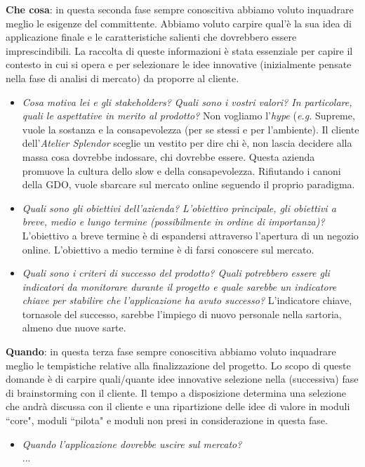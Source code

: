 \documentclass[12pt]{article}
\begin{document}
\textbf{Che cosa}: in questa seconda fase sempre conoscitiva abbiamo voluto inquadrare meglio le esigenze del committente. Abbiamo voluto carpire qual'è la sua idea di applicazione finale e le caratteristiche salienti che dovrebbero essere imprescindibili. La raccolta di queste informazioni è stata essenziale per capire il contesto in cui si opera e per selezionare le idee innovative (inizialmente pensate nella fase di analisi di mercato) da proporre al cliente.
\begin{itemize}
    \item {\em Cosa motiva lei e gli stakeholders? Quali sono i vostri valori? In particolare, quali le aspettative in merito al prodotto?} Non vogliamo l’{\em hype} ({\em e.g.} Supreme, vuole la sostanza e la consapevolezza (per se stessi e per l'ambiente). Il cliente dell'{\em Atelier Splendor} sceglie un vestito per dire chi è, non lascia decidere alla massa cosa dovrebbe indossare, chi dovrebbe essere. Questa azienda promuove la cultura dello slow e della consapevolezza. Rifiutando i canoni della GDO, vuole sbarcare sul mercato online seguendo il proprio paradigma.
    \item {\em Quali sono gli obiettivi dell’azienda? L’obiettivo principale, gli obiettivi a breve, medio e lungo termine (possibilmente in ordine di importanza)?} L'obiettivo a breve termine è di espandersi attraverso l'apertura di un negozio online. L'obiettivo a medio termine è di farsi conoscere sul mercato.
    \item {\em Quali sono i criteri di successo del prodotto? Quali potrebbero essere gli indicatori da monitorare durante il progetto e quale sarebbe un indicatore chiave per stabilire che l'applicazione ha avuto successo?} L'indicatore chiave, tornasole del successo, sarebbe l'impiego di nuovo personale nella sartoria, almeno due nuove sarte.
\end{itemize}

\textbf{Quando}: in questa terza fase sempre conoscitiva abbiamo voluto inquadrare meglio le tempistiche relative alla finalizzazione del progetto. Lo scopo di queste domande è di carpire quali/quante idee innovative selezione nella (successiva) fase di brainstorming con il cliente. Il tempo a disposizione determina una selezione che andrà discussa con il cliente e una ripartizione delle idee di valore in moduli ``core", moduli ``pilota" e moduli non presi in considerazione in questa fase.
\begin{itemize}
    \item {\em Quando l'applicazione dovrebbe uscire sul mercato?}
    \\
    ...
\end{itemize}
\end{document}
